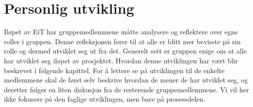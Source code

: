 \chapter{Personlig utvikling}
Iløpet av EiT har gruppemedlemmene måtte analysere og reflektere over egne roller i gruppen. 
Denne refleksjonen fører til at alle er blitt mer bevisste på sin rolle og dermed utviklet seg ut fra det. 
Generelt sett er gruppen enige om at alle har utviklet seg iløpet av prosjektet. 
Hvordan denne utviklingen har vært blir beskrevet i følgende kapittel. 
For å lettere se på utviklingen til de enkelte medlemmene skal de først selv beskrive hvordan de mener de har utviklet seg, og deretter følger en liten diskusjon fra de resterende gruppemedlemmene. 
Vi vil her ikke fokusere på den faglige utviklingen, men bare på prosessdelen. 





